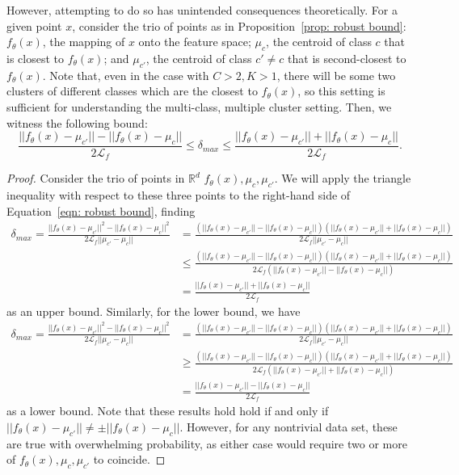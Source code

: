 However, attempting to do so has unintended consequences theoretically. For a given point $x$, consider the trio of points as in Proposition~\ref{prop: robust bound}: $f_\theta(x)$, the mapping of $x$ onto the feature space; $\mu_c$, the centroid of class $c$ that is closest to $f_\theta(x)$; and $\mu_{c'}$, the centroid of class $c'\neq c$ that is second-closest to $f_\theta(x)$. Note that, even in the case with $C > 2, K > 1$, there will be some two clusters of different classes which are the closest to $f_\theta(x)$, so this setting is sufficient for understanding the multi-class, multiple cluster setting. Then, we witness the following bound:
\begin{equation}
    \frac{||f_\theta(x) - \mu_{c'}|| - ||f_\theta(x) - \mu_c||}{2\mathcal{L}_f} \leq \delta_{max} \leq     \frac{||f_\theta(x) - \mu_{c'}|| + ||f_\theta(x) - \mu_c||}{2\mathcal{L}_f}.
\end{equation}
\begin{proof}
Consider the trio of points in $\mathbb{R}^d$ $f_\theta(x), \mu_c, \mu_{c'}$. We will apply the triangle inequality with respect to these three points to the right-hand side of Equation~\ref{eqn: robust bound}, finding
\begin{align*}
\delta_{max} = \frac{||f_\theta(x)-\mu_{c'}||^2 - ||f_\theta(x) - \mu_c||^2}{2\mathcal{L}_f||\mu_{c'}-\mu_c||} &= \frac{(||f_\theta(x) - \mu_{c'}|| - ||f_\theta(x) - \mu_c||)(||f_\theta(x) - \mu_{c'}|| + ||f_\theta(x) - \mu_c||)}{2\mathcal{L}_f||\mu_{c'}-\mu_c||}\\
&\leq \frac{(||f_\theta(x) - \mu_{c'}|| - ||f_\theta(x) - \mu_c||)(||f_\theta(x) - \mu_{c'}|| + ||f_\theta(x) - \mu_c||)}{2\mathcal{L}_f(||f_\theta(x) - \mu_{c'}|| - ||f_\theta(x) - \mu_c||)}\\
& = \frac{||f_\theta(x) - \mu_{c'}|| + ||f_\theta(x) - \mu_c||}{2\mathcal{L}_f}
\end{align*}
as an upper bound. Similarly, for the lower bound, we have
\begin{align*}
\delta_{max} = \frac{||f_\theta(x)-\mu_{c'}||^2 - ||f_\theta(x) - \mu_c||^2}{2\mathcal{L}_f||\mu_{c'}-\mu_c||} &= \frac{(||f_\theta(x) - \mu_{c'}|| - ||f_\theta(x) - \mu_c||)(||f_\theta(x) - \mu_{c'}|| + ||f_\theta(x) - \mu_c||)}{2\mathcal{L}_f||\mu_{c'}-\mu_c||}\\
&\geq \frac{(||f_\theta(x) - \mu_{c'}|| - ||f_\theta(x) - \mu_c||)(||f_\theta(x) - \mu_{c'}|| + ||f_\theta(x) - \mu_c||)}{2\mathcal{L}_f(||f_\theta(x) - \mu_{c'}|| + ||f_\theta(x) - \mu_c||)}\\
&= \frac{||f_\theta(x) - \mu_{c'}|| - ||f_\theta(x) - \mu_c||}{2\mathcal{L}_f}
\end{align*}
as a lower bound. Note that these results hold hold if and only if $||f_\theta(x) - \mu_{c'}|| \neq \pm||f_\theta(x) - \mu_c||$. However, for any nontrivial data set, these are true with overwhelming probability, as either case would require two or more of $f_\theta(x), \mu_c, \mu_{c'}$ to coincide. 
\end{proof}

